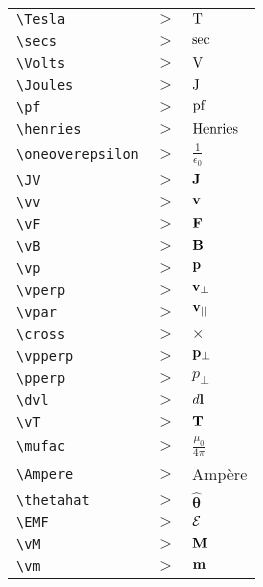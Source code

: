 \begin{tabular}{l l l}

\verb|\Tesla| &$\gt$& ${\hbox{T}}$\\[5pt] 
\verb|\secs| &$\gt$& ${\hbox{sec}}$\\[5pt] 
\verb|\Volts| &$\gt$& ${\hbox{V}}$\\[5pt] 
\verb|\Joules| &$\gt$& ${\hbox{J}}$\\[5pt] 
\verb|\pf| &$\gt$& ${\hbox{pf}}$\\[5pt] 
\verb|\henries| &$\gt$& ${\hbox{Henries}}$\\[5pt] 
\verb|\oneoverepsilon| &$\gt$& ${\frac{1}{\epsilon_0}}$\\[5pt] 
\verb|\JV| &$\gt$& ${{\bf J}}$\\[5pt] 
\verb|\vv| &$\gt$& ${{\bf v}}$\\[5pt] 
\verb|\vF| &$\gt$& ${{\bf F}}$\\[5pt] 
\verb|\vB| &$\gt$& ${{\bf B}}$\\[5pt] 
\verb|\vp| &$\gt$& ${{\bf p}}$\\[5pt] 
\verb|\vperp| &$\gt$& ${{\bf v}_{\perp}}$\\[5pt] 
\verb|\vpar| &$\gt$& ${{\bf v}_{||}}$\\[5pt] 
\verb|\cross| &$\gt$& ${\times}$\\[5pt] 
\verb|\vpperp| &$\gt$& ${{\bf p}_{\perp}}$\\[5pt] 
\verb|\pperp| &$\gt$& ${p_{\perp}}$\\[5pt] 
\verb|\dvl| &$\gt$& ${d{\bf l}}$\\[5pt] 
\verb|\vT| &$\gt$& ${{\bf T}}$\\[5pt] 
\verb|\mufac| &$\gt$& ${\frac{\mu_0}{ 4\pi}}$\\[5pt] 
\verb|\Ampere| &$\gt$& {Amp\`ere} \\[5pt] 
\verb|\thetahat| &$\gt$& ${\hat{\mathbf \theta}}$\\[5pt] 
\verb|\EMF| &$\gt$& ${{\cal E}}$\\[5pt] 
\verb|\vM| &$\gt$& ${{\bf M}}$\\[5pt] 
\verb|\vm| &$\gt$& ${{\bf m}}$\\[5pt] 
\end{tabular}

